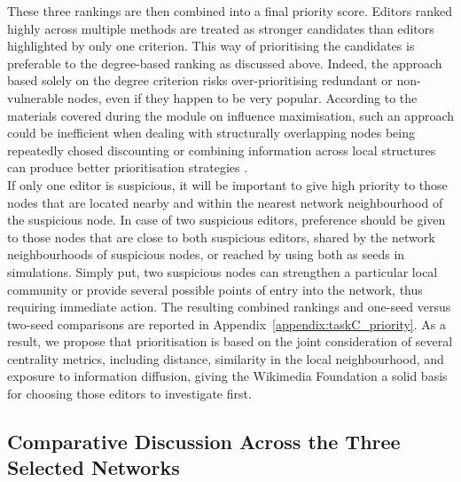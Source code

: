 \documentclass[acmsmall,nonacm,natbib=false]{acmart}
\begin{document}
These three rankings are then combined into a final priority score. Editors ranked highly across multiple methods are treated as stronger candidates than editors highlighted by only one criterion.  This way of prioritising the candidates is preferable to the degree-based ranking as discussed above. Indeed, the approach based solely on the degree criterion risks over-prioritising redundant or non-vulnerable nodes, even if they happen to be very popular.  According to the materials covered during the module on influence maximisation, such an approach could be inefficient when dealing with structurally overlapping nodes being repeatedly chosed  discounting or combining information across local structures can produce better prioritisation strategies \cite{easley2010networks}.\\
If only one editor is suspicious, it will be important to give high priority to those nodes that are located nearby and within the nearest network neighbourhood of the suspicious node. In case of two suspicious editors, preference should be given to those nodes that are close to both suspicious editors, shared by the network neighbourhoods of suspicious nodes, or reached by using both as seeds in simulations. Simply put, two suspicious nodes can strengthen a particular local community or provide several possible points of entry into the network, thus requiring immediate action.
The resulting combined rankings and one-seed versus two-seed comparisons are reported in Appendix~\ref{appendix:taskC_priority}. As a result, we propose that prioritisation is based on the joint consideration of several centrality metrics, including distance, similarity in the local neighbourhood, and exposure to information diffusion, giving the Wikimedia Foundation a solid basis for choosing those editors to investigate first.


\subsection{\LARGE{Comparative Discussion Across the Three Selected Networks}}
\end{document}
